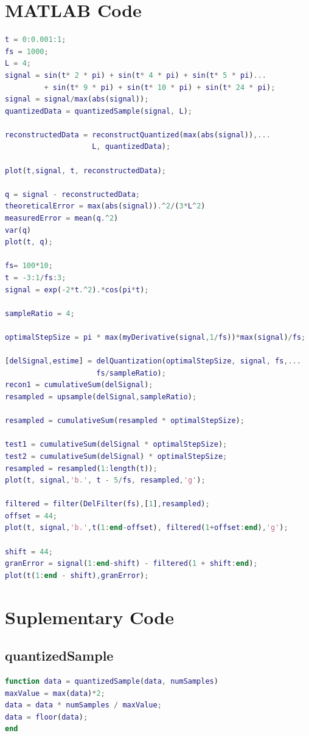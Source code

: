 \documentclass{article}
\begin{document}
\section{MATLAB Code}
\begin{lstlisting}[language = MATLAB]
t = 0:0.001:1;
fs = 1000;
L = 4;
signal = sin(t* 2 * pi) + sin(t* 4 * pi) + sin(t* 5 * pi)...
         + sin(t* 9 * pi) + sin(t* 10 * pi) + sin(t* 24 * pi);
signal = signal/max(abs(signal));
quantizedData = quantizedSample(signal, L);

reconstructedData = reconstructQuantized(max(abs(signal)),...
                    L, quantizedData);

plot(t,signal, t, reconstructedData);

q = signal - reconstructedData;
theoreticalError = max(abs(signal)).^2/(3*L^2)
measuredError = mean(q.^2)
var(q)
plot(t, q);

fs= 100*10;
t = -3:1/fs:3;
signal = exp(-2*t.^2).*cos(pi*t);

sampleRatio = 4;

optimalStepSize = pi * max(myDerivative(signal,1/fs))*max(signal)/fs;

[delSignal,estime] = delQuantization(optimalStepSize, signal, fs,...
                     fs/sampleRatio);
recon1 = cumulativeSum(delSignal);
resampled = upsample(delSignal,sampleRatio);

resampled = cumulativeSum(resampled * optimalStepSize);

test1 = cumulativeSum(delSignal * optimalStepSize);
test2 = cumulativeSum(delSignal) * optimalStepSize;
resampled = resampled(1:length(t));
plot(t, signal,'b.', t - 5/fs, resampled,'g');

filtered = filter(DelFilter(fs),[1],resampled);
offset = 44;
plot(t, signal,'b.',t(1:end-offset), filtered(1+offset:end),'g');

shift = 44;
granError = signal(1:end-shift) - filtered(1 + shift:end);
plot(t(1:end - shift),granError);

\end{lstlisting}
\section{Suplementary Code}
\subsection{quantizedSample}
\begin{lstlisting}[language = MATLAB]
function data = quantizedSample(data, numSamples)
maxValue = max(data)*2;
data = data * numSamples / maxValue;
data = floor(data);
end
\end{lstlisting}
\end{document}
